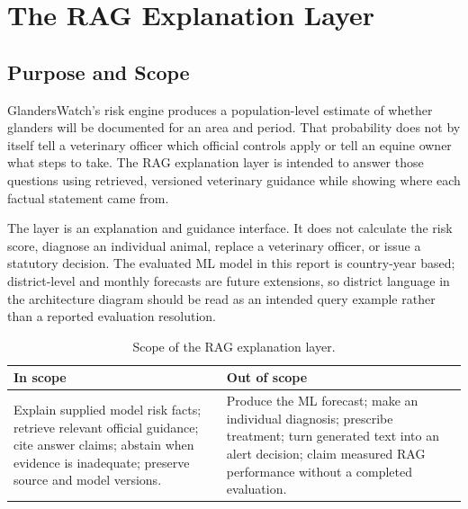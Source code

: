 \documentclass[10pt,openany]{report}
\begin{document}
\section{The RAG Explanation Layer}
\label{ch:rag}

\subsection{Purpose and Scope}

GlandersWatch's risk engine produces a population-level estimate of whether glanders will be
documented for an area and period. That probability does not by itself tell a veterinary officer
which official controls apply or tell an equine owner what steps to take. The RAG explanation layer
is intended to answer those questions using retrieved, versioned veterinary guidance while showing
where each factual statement came from.

The layer is an explanation and guidance interface. It does not calculate the risk score, diagnose
an individual animal, replace a veterinary officer, or issue a statutory decision. The evaluated ML
model in this report is country-year based; district-level and monthly forecasts are future
extensions, so district language in the architecture diagram should be read as an intended query
example rather than a reported evaluation resolution.

\begin{table}[htbp]
\centering
\caption{Scope of the RAG explanation layer.}
\label{tab:rag-scope}
\small
\begin{tabular}{@{}>{\raggedright\arraybackslash}p{7.2cm}
                >{\raggedright\arraybackslash}p{7.2cm}@{}}
\toprule
\textbf{In scope} & \textbf{Out of scope} \\
\midrule
Explain supplied model risk facts; retrieve relevant official guidance; cite answer claims; abstain when evidence is inadequate; preserve source and model versions. &
Produce the ML forecast; make an individual diagnosis; prescribe treatment; turn generated text into an alert decision; claim measured RAG performance without a completed evaluation. \\
\bottomrule
\end{tabular}
\end{table}
\end{document}
